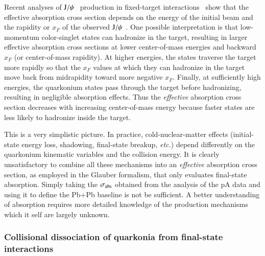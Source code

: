 Recent analyses of $\mathrm{J}/\psi\hspace {0.05in}$ production
in fixed-target interactions~\cite{Lourenco:2008sk} 
show that the effective absorption
cross section depends on the energy of the initial beam and the rapidity or
$x_F$ of the observed $\mathrm{J}/\psi\hspace {0.05in}$.  One possible interpretation is that 
low-momentum color-singlet states can hadronize in the
target, resulting in larger effective absorption cross sections at lower
center-of-mass energies and backward $x_F$ (or center-of-mass rapidity).
At higher energies, the states traverse the target more rapidly so that
the $x_F$ values at which they can hadronize in the target move 
back from midrapidity toward more negative $x_F$.
Finally, at sufficiently high energies, the quarkonium states pass 
through the target before hadronizing, resulting in negligible absorption
effects.  Thus the {\it effective} absorption cross section decreases with 
increasing center-of-mass energy because faster states are less likely 
to hadronize inside the target.

This is a very simplistic picture. In practice, cold-nuclear-matter effects 
(initial-state energy loss, shadowing, final-state breakup, {\it etc.}) 
depend differently on the quarkonium kinematic variables and the collision energy. 
It is clearly unsatisfactory to combine all these mechanisms into an {\it effective} 
absorption cross section, as employed in the Glauber formalism, 
that only evaluates final-state absorption. 
Simply taking the $\sigma_{\rm abs}$ obtained from 
the analysis of the pA data 
and using it to define the Pb+Pb baseline is not be sufficient. 
A better understanding of absorption requires more detailed knowledge of the 
production mechanisms which it self are largely unknown.













\subsubsection{Collisional dissociation of quarkonia from final-state interactions}

